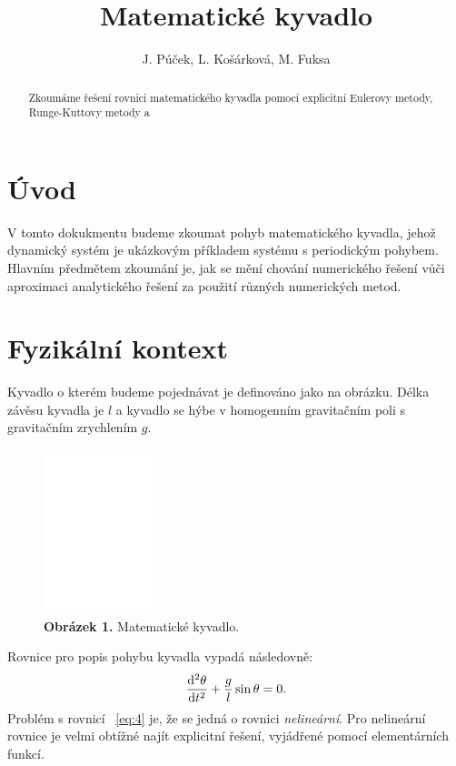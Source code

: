 \documentclass[reqno, a4paper]{amsart}
\author{J. Púček, L. Košárková, M. Fuksa}
\title{Matematické kyvadlo}
\begin{document}
	
	\begin{abstract}
		Zkoumáme řešení rovnici matematického kyvadla pomocí explicitní Eulerovy metody, Runge-Kuttovy metody a
	\end{abstract}
	
	\maketitle
	
		\tableofcontents
		
		\section{Úvod}
		\label{sec:Úvod}
		
		V tomto dokukmentu budeme zkoumat pohyb matematického kyvadla, jehož dynamický systém je ukázkovým příkladem systému s periodickým pohybem. Hlavním předmětem zkoumání je, jak se mění chování numerického řešení vůči aproximaci analytického řešení za použití různých numerických metod.
		
		\section{Fyzikální kontext}
		\label{sec:Fyzikální kontext}
		Kyvadlo o kterém budeme pojednávat je definováno jako na obrázku. Délka závěsu kyvadla je $l$ a kyvadlo se hýbe v homogenním gravitačním poli s gravitačním zrychlením $g$.
		
		\begin{figure}[h]
			\centering
			\includegraphics[width=0.3\textwidth]{pendulum-intro}
			\caption*{\textbf{Obrázek 1.} Matematické kyvadlo.}  
			\label{fig:pendulum-intro}
		\end{figure}
		
		Rovnice pro popis pohybu kyvadla vypadá následovně:
		\begin{equation}
			\label{eq:4}
			\frac{\mathrm{d}^2 {\theta}}{\mathrm{d} {t}^2} + \frac{g}{l} \sin \theta = 0.
		\end{equation}
		Problém s rovnicí ~\eqref{eq:4} je, že se jedná o rovnici \emph{nelineární}. Pro nelineární rovnice je velmi obtížné najít explicitní řešení, vyjádřené pomocí elementárních funkcí.
		
\end{document}
